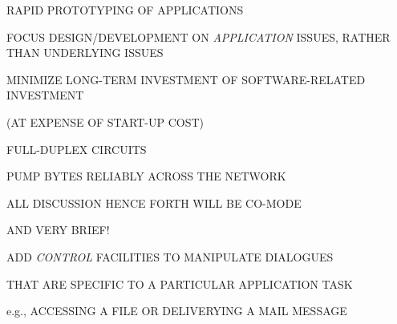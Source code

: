 \begin{bwslide}

\begin{nrtc}
\item	RAPID PROTOTYPING OF APPLICATIONS

\item	FOCUS DESIGN/DEVELOPMENT ON \emph{APPLICATION} ISSUES,
	RATHER THAN UNDERLYING ISSUES

\item	MINIMIZE LONG-TERM INVESTMENT OF SOFTWARE-RELATED INVESTMENT
    \begin{nrtc}
    \item	(AT EXPENSE OF START-UP COST)
    \end{nrtc}
\end{nrtc}
\end{bwslide}


\begin{bwslide}

\end{bwslide}


\begin{bwslide}

\begin{nrtc}
\item	FULL-DUPLEX CIRCUITS

\item	PUMP BYTES RELIABLY ACROSS THE NETWORK

\item	ALL DISCUSSION HENCE FORTH WILL BE CO-MODE
    \begin{nrtc}
    \item	AND VERY BRIEF!
    \end{nrtc}
\end{nrtc}
\end{bwslide}


\begin{bwslide}

\begin{nrtc}
\item	ADD \emph{CONTROL} FACILITIES TO MANIPULATE DIALOGUES

\item	THAT ARE SPECIFIC TO A PARTICULAR APPLICATION TASK
    \begin{nrtc}
    \item	e.g., ACCESSING A FILE OR DELIVERYING A MAIL MESSAGE
    \end{nrtc}
\end{nrtc}
\end{bwslide}


